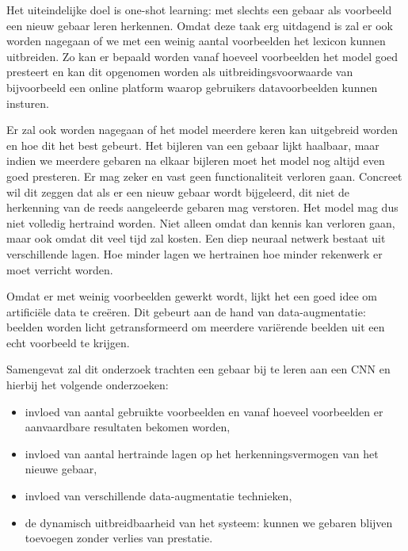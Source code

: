 \npar  Het uiteindelijke doel is one-shot learning: met slechts een gebaar als voorbeeld een nieuw gebaar leren herkennen.  Omdat deze taak erg uitdagend is zal er ook worden nagegaan of we met een weinig aantal voorbeelden het lexicon kunnen uitbreiden. Zo kan er bepaald worden vanaf hoeveel voorbeelden het model goed presteert en kan dit opgenomen worden als uitbreidingsvoorwaarde van bijvoorbeeld een online platform waarop gebruikers datavoorbeelden kunnen insturen.

\npar Er zal ook worden nagegaan of het model meerdere keren kan uitgebreid worden en hoe dit het best gebeurt. Het bijleren van een gebaar lijkt haalbaar, maar indien we meerdere gebaren na elkaar bijleren moet het model nog altijd even goed presteren. Er mag zeker en vast geen functionaliteit verloren gaan. Concreet wil dit zeggen dat als er een nieuw gebaar wordt bijgeleerd, dit niet de herkenning van de reeds aangeleerde gebaren mag verstoren. Het model mag dus niet volledig hertraind worden. Niet alleen omdat dan kennis kan verloren gaan, maar ook omdat dit veel tijd zal kosten. Een diep neuraal netwerk bestaat uit verschillende lagen. Hoe minder lagen we hertrainen hoe minder rekenwerk er moet verricht worden.

\npar Omdat er met weinig voorbeelden gewerkt wordt, lijkt het een goed idee om artifici\"ele data te cre\"eren. Dit gebeurt aan de hand van data-augmentatie: beelden worden licht getransformeerd om meerdere vari\"erende beelden uit een echt voorbeeld te krijgen.

\npar Samengevat zal dit onderzoek trachten een gebaar bij te leren aan een CNN en hierbij het volgende onderzoeken:
\begin{itemize}
	\item invloed van aantal gebruikte voorbeelden en vanaf hoeveel voorbeelden er aanvaardbare resultaten bekomen worden,
	\item invloed van aantal hertrainde lagen op het herkenningsvermogen van het nieuwe gebaar,
	\item invloed van verschillende data-augmentatie technieken,
	\item de dynamisch uitbreidbaarheid van het systeem: kunnen we gebaren blijven toevoegen zonder verlies van prestatie.
\end{itemize}






 